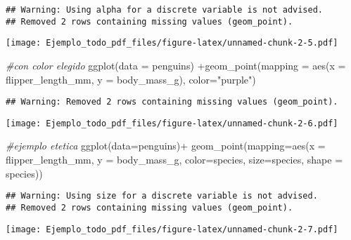 \documentclass[
]{article}
\newenvironment{Shaded}{\begin{snugshade}}{\end{snugshade}}
\newcommand{\AttributeTok}[1]{\textcolor[rgb]{0.77,0.63,0.00}{#1}}
\newcommand{\CommentTok}[1]{\textcolor[rgb]{0.56,0.35,0.01}{\textit{#1}}}
\newcommand{\FunctionTok}[1]{\textcolor[rgb]{0.00,0.00,0.00}{#1}}
\newcommand{\NormalTok}[1]{#1}
\newcommand{\SpecialCharTok}[1]{\textcolor[rgb]{0.00,0.00,0.00}{#1}}
\newcommand{\StringTok}[1]{\textcolor[rgb]{0.31,0.60,0.02}{#1}}
\begin{document}
\begin{verbatim}
## Warning: Using alpha for a discrete variable is not advised.
## Removed 2 rows containing missing values (geom_point).
\end{verbatim}

\texttt{[image: Ejemplo\_todo\_pdf\_files/figure-latex/unnamed-chunk-2-5.pdf]}

\begin{Shaded}
\begin{Highlighting}[]
\CommentTok{\#con color elegido}
\FunctionTok{ggplot}\NormalTok{(}\AttributeTok{data =}\NormalTok{ penguins) }\SpecialCharTok{+}\FunctionTok{geom\_point}\NormalTok{(}\AttributeTok{mapping =} \FunctionTok{aes}\NormalTok{(}\AttributeTok{x =}\NormalTok{ flipper\_length\_mm, }\AttributeTok{y =}
\NormalTok{                                                    body\_mass\_g), }\AttributeTok{color=}\StringTok{"purple"}\NormalTok{)}
\end{Highlighting}
\end{Shaded}

\begin{verbatim}
## Warning: Removed 2 rows containing missing values (geom_point).
\end{verbatim}

\texttt{[image: Ejemplo\_todo\_pdf\_files/figure-latex/unnamed-chunk-2-6.pdf]}

\begin{Shaded}
\begin{Highlighting}[]
\CommentTok{\#ejemplo etetica}
\FunctionTok{ggplot}\NormalTok{(}\AttributeTok{data=}\NormalTok{penguins)}\SpecialCharTok{+} \FunctionTok{geom\_point}\NormalTok{(}\AttributeTok{mapping=}\FunctionTok{aes}\NormalTok{(}\AttributeTok{x =}\NormalTok{ flipper\_length\_mm, }\AttributeTok{y =}
\NormalTok{                                        body\_mass\_g, }\AttributeTok{color=}\NormalTok{species, }\AttributeTok{size=}\NormalTok{species, }\AttributeTok{shape =}\NormalTok{ species)) }
\end{Highlighting}
\end{Shaded}

\begin{verbatim}
## Warning: Using size for a discrete variable is not advised.
## Removed 2 rows containing missing values (geom_point).
\end{verbatim}

\texttt{[image: Ejemplo\_todo\_pdf\_files/figure-latex/unnamed-chunk-2-7.pdf]}
\end{document}

